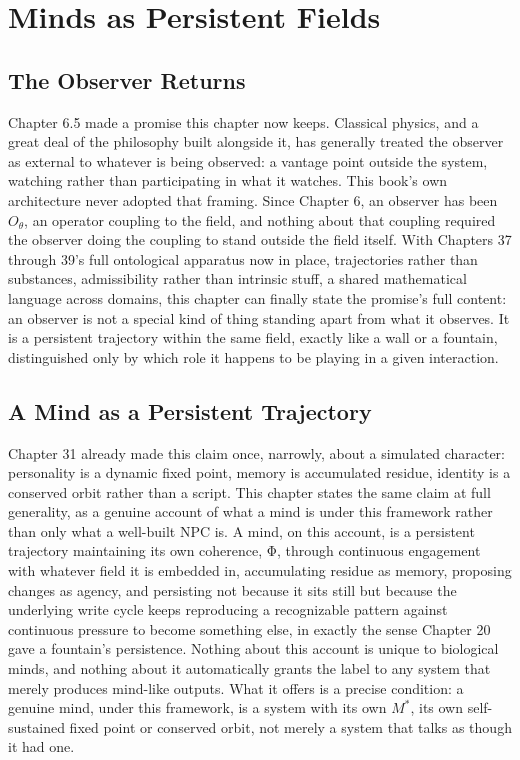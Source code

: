 \chapter{Minds as Persistent Fields}

\section{The Observer Returns}

Chapter 6.5 made a promise this chapter now keeps. Classical physics, and a great deal of the philosophy built alongside it, has generally treated the observer as external to whatever is being observed: a vantage point outside the system, watching rather than participating in what it watches. This book's own architecture never adopted that framing. Since Chapter 6, an observer has been \(O_\theta\), an operator coupling to the field, and nothing about that coupling required the observer doing the coupling to stand outside the field itself. With Chapters 37 through 39's full ontological apparatus now in place, trajectories rather than substances, admissibility rather than intrinsic stuff, a shared mathematical language across domains, this chapter can finally state the promise's full content: an observer is not a special kind of thing standing apart from what it observes. It is a persistent trajectory within the same field, exactly like a wall or a fountain, distinguished only by which role it happens to be playing in a given interaction.

\section{A Mind as a Persistent Trajectory}

Chapter 31 already made this claim once, narrowly, about a simulated character: personality is a dynamic fixed point, memory is accumulated residue, identity is a conserved orbit rather than a script. This chapter states the same claim at full generality, as a genuine account of what a mind is under this framework rather than only what a well-built NPC is. A mind, on this account, is a persistent trajectory maintaining its own coherence, Φ, through continuous engagement with whatever field it is embedded in, accumulating residue as memory, proposing changes as agency, and persisting not because it sits still but because the underlying write cycle keeps reproducing a recognizable pattern against continuous pressure to become something else, in exactly the sense Chapter 20 gave a fountain's persistence. Nothing about this account is unique to biological minds, and nothing about it automatically grants the label to any system that merely produces mind-like outputs. What it offers is a precise condition: a genuine mind, under this framework, is a system with its own \(M^*\), its own self-sustained fixed point or conserved orbit, not merely a system that talks as though it had one.

